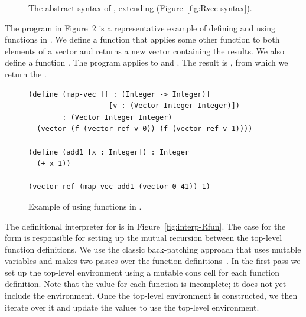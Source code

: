 \documentclass[11pt]{book}
\newcommand{\gray}[1]{{\color{gray} #1}}
\begin{document}
\begin{figure}[tp]
\centering
\fbox{
  \begin{minipage}{0.96\textwidth}
    \small
\[
\begin{array}{lcl}
\Exp &::=& \gray{ \INT{\Int} \VAR{\Var} \mid \LET{\Var}{\Exp}{\Exp} } \\
     &\mid& \gray{ \PRIM{\itm{op}}{\Exp\ldots} }\\
     &\mid& \gray{ \BOOL{\itm{bool}} 
      \mid \IF{\Exp}{\Exp}{\Exp} } \\
     &\mid& \gray{ \VOID{} \mid \LP\key{HasType}~\Exp~\Type \RP } 
     \mid \APPLY{\Exp}{\Exp\ldots}\\
 \Def &::=& \FUNDEF{\Var}{\LP[\Var \code{:} \Type]\ldots\RP}{\Type}{\code{'()}}{\Exp}\\
  \LangFun{} &::=& \PROGRAMDEFSEXP{\code{'()}}{\LP\Def\ldots\RP)}{\Exp}
\end{array}
\]
\end{minipage}
}
\caption{The abstract syntax of \LangFun{}, extending \LangVec{} (Figure~\ref{fig:Rvec-syntax}).}
\label{fig:Rfun-syntax}
\end{figure}


The program in Figure~\ref{fig:Rfun-function-example} is a
representative example of defining and using functions in \LangFun{}.  We
define a function  that applies some other function
 to both elements of a vector and returns a new
vector containing the results. We also define a function .
The program applies
 to  and .  The result is
, from which we return the .

\begin{figure}[tbp]
\begin{lstlisting}
(define (map-vec [f : (Integer -> Integer)]
                   [v : (Vector Integer Integer)])
        : (Vector Integer Integer)
  (vector (f (vector-ref v 0)) (f (vector-ref v 1))))

(define (add1 [x : Integer]) : Integer
  (+ x 1))

(vector-ref (map-vec add1 (vector 0 41)) 1)
\end{lstlisting}
\caption{Example of using functions in \LangFun{}.}
\label{fig:Rfun-function-example}
\end{figure}

The definitional interpreter for \LangFun{} is in
Figure~\ref{fig:interp-Rfun}. The case for the  form is
responsible for setting up the mutual recursion between the top-level
function definitions. We use the classic back-patching 
approach that uses mutable variables and makes two passes over the function
definitions~\citep{Kelsey:1998di}.  In the first pass we set up the
top-level environment using a mutable cons cell for each function
definition. Note that the  value for each function is
incomplete; it does not yet include the environment.  Once the
top-level environment is constructed, we then iterate over it and
update the  values to use the top-level environment.
\end{document}
